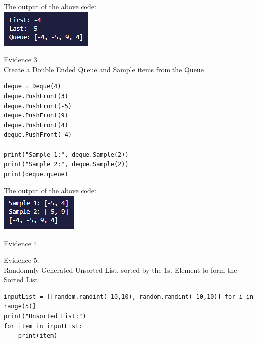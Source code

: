 \begin{flushleft}
\begin{center}
        The output of the above code: \\
        \includegraphics{Images/Testing/T3.9.1.PNG}
        \vspace{1cm}

        {\large Evidence 3.\rn } \\ 
        \vspace{0.3cm}
        Create a Double Ended Queue and Sample items from the Queue \\

        \begin{verbatim}
deque = Deque(4)
deque.PushFront(3)
deque.PushFront(-5)
deque.PushFront(9)
deque.PushFront(4)
deque.PushFront(-4)

print("Sample 1:", deque.Sample(2))
print("Sample 2:", deque.Sample(2))
print(deque.queue)
        \end{verbatim}

        The output of the above code: \\
        \includegraphics{Images/Testing/T3.10.1.PNG}
        \vspace{1cm}
    \end{center}

    \setcounter{magicrownumbers}{0}
    \begin{center}
        {\large Evidence 4.\rn } \\ 
        \vspace{0.3cm}

    \end{center}

    \setcounter{magicrownumbers}{0}
    \begin{center}
        {\large Evidence 5.\rn } \\ 
        \vspace{0.3cm}
        Randomnly Generated Unsorted List, sorted by the 1st Element to form the Sorted List \\

        \begin{verbatim}
inputList = [[random.randint(-10,10), random.randint(-10,10)] for i in range(5)]
print("Unsorted List:")
for item in inputList:
    print(item)


\end{verbatim}
\end{center}
\end{flushleft}
